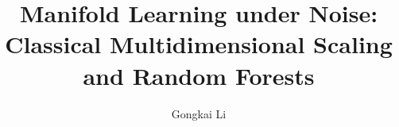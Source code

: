 \documentclass[12pt,oneside,final]{thesis}
\begin{document}
\title{Manifold Learning under Noise: Classical Multidimensional Scaling and Random Forests}
\author{Gongkai Li}
\dissertation
\doctorphilosophy
\copyrightnotice







%

%


%
%

\def\newblock{\hskip .11em plus.33em minus.07em}




\end{document}
